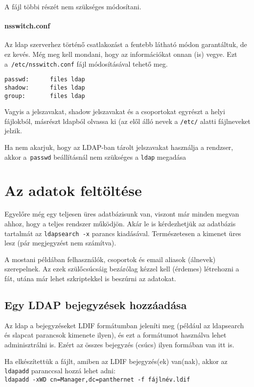 A fájl többi részét nem szükséges módosítani.


\paragraph{nsswitch.conf} Az ldap szerverhez történő csatlakozást a fentebb látható módon garantáltuk, de ez
kevés. Még meg kell mondani, hogy az információkat onnan (is) vegye. Ezt a~\texttt{/etc/nsswitch.conf} fájl
módosításával tehető meg.

\begin{Verbatim}[frame=single,label=/etc/nsswitch.conf ldapot használó része]
passwd:      files ldap
shadow:      files ldap
group:       files ldap
\end{Verbatim}

Vagyis a jelszavakat, shadow jelszavakat és a csoportokat egyrészt a helyi fájlokból, másrészt ldapból olvassa ki (az
elől álló nevek a \texttt{/etc/} alatti fájlneveket jelzik.

Ha nem akarjuk, hogy az LDAP-ban tárolt jelszavakat használja a rendzser, akkor a~\texttt{passwd} beállításnál nem
szükséges a \texttt{ldap} megadása

\section{Az adatok feltöltése}
Egyelőre még egy teljesen üres adatbázisunk van, viszont már minden megvan ahhoz, hogy a teljes rendszer működjön. Akár
le is kérdezhetjük az adatbázis tartalmát az \texttt{ldapsearch -x} parancs kiadásával. Természetesen a kimenet üres
lesz (pár megjegyzést nem számítva).

A mostani példában felhasználók, csoportok és email aliasok (álnevek) szerepelnek. Az ezek szülőcsúcsáig bezárólag
kézzel kell (érdemes) létrehozni a fát, utána már lehet szkriptekkel is beszúrni az adatokat.



\subsection{Egy LDAP bejegyzések hozzáadása}

Az ldap a bejegyzéseket LDIF formátumban jeleníti meg (például az ldapsearch és slapcat parancsok kimenete ilyen), és
ezt a formátumot használva lehet adminisztrálni is. Ezért az összes bejegyzés (csúcs) ilyen formában van itt is.

Ha elkészítettük a fájlt, amiben az LDIF bejegyzés(ek) van(nak), akkor az \texttt{ldapadd} paranccsal hozzá lehet adni:\\
\texttt{ldapadd -xWD cn=Manager,dc=panthernet -f fájlnév.ldif}

